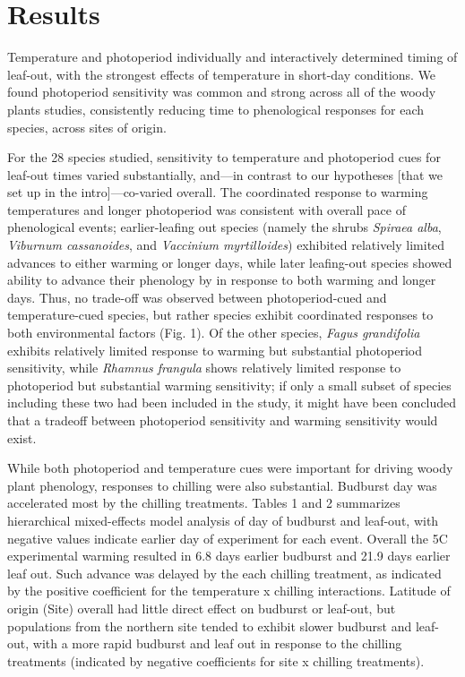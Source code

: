 \documentclass[11pt]{article}
\begin{document}
\section*{Results}

Temperature and photoperiod individually and interactively determined timing of leaf-out, with the strongest effects of temperature in short-day conditions. We found photoperiod sensitivity was common and strong across all of the woody plants studies, consistently reducing time to phenological responses for each species, across sites of origin. 

For the 28 species studied, sensitivity to temperature and photoperiod cues for leaf-out times varied substantially, and---in contrast to our hypotheses [that we set up in the intro]---co-varied overall. The coordinated response to warming temperatures and longer photoperiod was consistent with overall pace of phenological events; earlier-leafing out species (namely the shrubs \emph{Spiraea alba}, \emph{Viburnum cassanoides}, and \emph{Vaccinium myrtilloides}) exhibited relatively limited advances to either warming or longer days, while later leafing-out species showed ability to advance their phenology by in response to both warming and longer days. Thus, no trade-off was observed between photoperiod-cued and temperature-cued species, but rather species exhibit coordinated responses to both environmental factors (Fig. 1). Of the other species, \emph{Fagus grandifolia} exhibits relatively limited response to warming but substantial photoperiod sensitivity, while \emph{Rhamnus frangula} shows relatively limited response to photoperiod but substantial warming sensitivity; if only a small subset of species including these two had been included in the study, it might have been concluded that a tradeoff between photoperiod sensitivity and warming sensitivity would exist. 

While both photoperiod and temperature cues were important for driving woody plant phenology, responses to chilling were also substantial. Budburst day was accelerated most by the chilling treatments. Tables 1 and 2 summarizes hierarchical mixed-effects model analysis of day of budburst and leaf-out, with negative values indicate earlier day of experiment for each event. Overall the 5\degree C experimental warming resulted in 6.8 days earlier budburst and 21.9 days earlier leaf out. Such advance was delayed by the each chilling treatment, as indicated by the positive coefficient for the temperature x chilling interactions. Latitude of origin (Site) overall had little direct effect on budburst or leaf-out, but populations from the northern site tended to exhibit slower budburst and leaf-out, with a more rapid budburst and leaf out in response to the chilling treatments (indicated by negative coefficients for site x chilling treatments).
\end{document}
